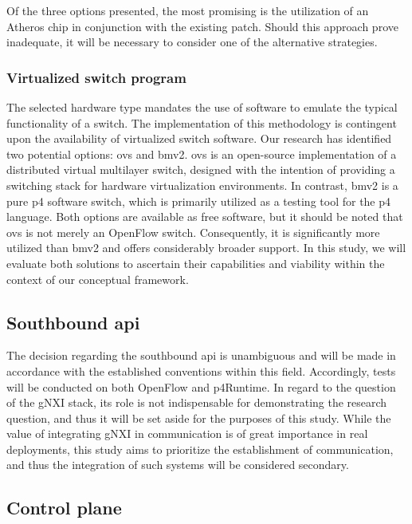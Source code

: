 Of the three options presented, the most promising is the utilization of an Atheros chip in conjunction with the existing patch. Should this approach prove inadequate, it will be necessary to consider one of the alternative strategies.

\subsubsection{Virtualized switch program}
The selected hardware type mandates the use of software to emulate the typical functionality of a switch. The implementation of this methodology is contingent upon the availability of virtualized switch software. Our research has identified two potential options: \gls{ovs}\cite{noauthor_open_nodate-3} and \gls{bmv2}\cite{noauthor_p4langbehavioral-model_nodate}.
\gls{ovs} is an open-source implementation of a distributed virtual multilayer switch, designed with the intention of providing a switching stack for hardware virtualization environments. In contrast, \gls{bmv2} is a pure \gls{p4} software switch, which is primarily utilized as a testing tool for the \gls{p4} language. Both options are available as free software, but it should be noted that \gls{ovs} is not merely an OpenFlow switch. Consequently, it is significantly more utilized than \gls{bmv2} and offers considerably broader support.
In this study, we will evaluate both solutions to ascertain their capabilities and viability within the context of our conceptual framework.

\subsection[Southbound API]{Southbound \gls{api}}

The decision regarding the southbound \gls{api} is unambiguous and will be made in accordance with the established conventions within this field. Accordingly, tests will be conducted on both OpenFlow and \gls{p4}Runtime. In regard to the question of the gNXI stack, its role is not indispensable for demonstrating the research question, and thus it will be set aside for the purposes of this study. While the value of integrating gNXI in communication is of great importance in real deployments, this study aims to prioritize the establishment of communication, and thus the integration of such systems will be considered secondary. 

\subsection{Control plane}

